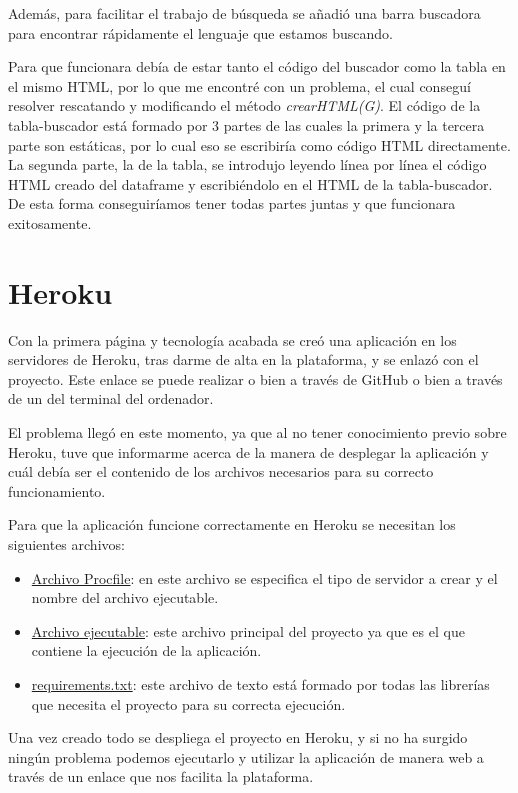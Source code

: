 Además, para facilitar el trabajo de búsqueda se añadió una barra buscadora para encontrar rápidamente el lenguaje que estamos buscando.

Para que funcionara debía de estar tanto el código del buscador como la tabla en el mismo HTML, por lo que me encontré con un problema, el cual conseguí resolver rescatando y modificando el método \textit{crearHTML(G)}. El código de la tabla-buscador está formado por 3 partes de las cuales la primera y la tercera parte son estáticas, por lo cual eso se escribiría como código HTML directamente. La segunda parte, la de la tabla, se introdujo leyendo línea por línea el código HTML creado del dataframe y escribiéndolo en el HTML de la tabla-buscador. De esta forma conseguiríamos tener todas partes juntas y que funcionara exitosamente.

\section{Heroku}
Con la primera página y tecnología acabada se creó una aplicación en los servidores de Heroku, tras darme de alta en la plataforma, y se enlazó con el proyecto. Este enlace se puede realizar o bien a través de GitHub o bien a través de un del terminal del ordenador.

El problema llegó en este momento, ya que al no tener conocimiento previo sobre Heroku, tuve que informarme acerca de la manera de desplegar la aplicación y cuál debía ser el contenido de los archivos necesarios para su correcto funcionamiento.

Para que la aplicación funcione correctamente en Heroku se necesitan los siguientes archivos:
\begin{itemize}
    \item \underline{Archivo Procfile}: en este archivo se especifica el tipo de servidor a crear y el nombre del archivo ejecutable.
    \item \underline{Archivo ejecutable}: este archivo principal del proyecto ya que es el que contiene la ejecución de la aplicación.
    \item \underline{requirements.txt}: este archivo de texto está formado por todas las librerías que necesita el proyecto para su correcta ejecución.
\end{itemize}

Una vez creado todo se despliega el proyecto en Heroku, y si no ha surgido ningún problema podemos ejecutarlo y utilizar la aplicación de manera web a través de un enlace que nos facilita la plataforma. 


